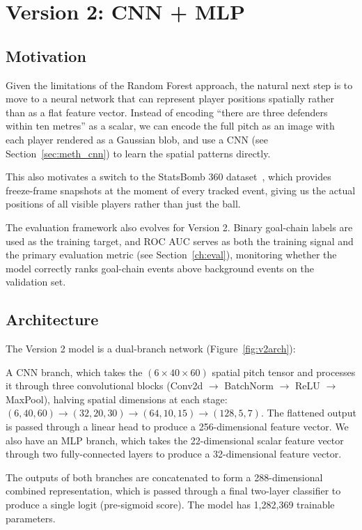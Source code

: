 \chapter{Version 2: CNN + MLP}\label{ch:v2}

\section{Motivation}

Given the limitations of the Random Forest approach, the natural next step is to move to a neural network that can represent player positions spatially rather than as a flat feature vector. Instead of encoding ``there are three defenders within ten metres'' as a scalar, we can encode the full pitch as an image with each player rendered as a Gaussian blob, and use a CNN (see Section~\ref{sec:meth_cnn}) to learn the spatial patterns directly.

This also motivates a switch to the StatsBomb 360 dataset~\cite{statsbomb360}, which provides freeze-frame snapshots at the moment of every tracked event, giving us the actual positions of all visible players rather than just the ball.

The evaluation framework also evolves for Version 2. Binary goal-chain labels are used as the training target, and ROC AUC serves as both the training signal and the primary evaluation metric (see Section~\ref{ch:eval}), monitoring whether the model correctly ranks goal-chain events above background events on the validation set.

\section{Architecture}

The Version 2 model is a dual-branch network (Figure~\ref{fig:v2arch}):

A CNN branch, which takes the $(6 \times 40 \times 60)$ spatial pitch tensor and processes it through three convolutional blocks (Conv2d $\to$ BatchNorm $\to$ ReLU $\to$ MaxPool), halving spatial dimensions at each stage: $(6,40,60) \to (32,20,30) \to (64,10,15) \to (128,5,7)$. The flattened output is passed through a linear head to produce a 256-dimensional feature vector. We also have an MLP branch, which takes the 22-dimensional scalar feature vector through two fully-connected layers to produce a 32-dimensional feature vector.

The outputs of both branches are concatenated to form a 288-dimensional combined representation, which is passed through a final two-layer classifier to produce a single logit (pre-sigmoid score). The model has 1,282,369 trainable parameters.


